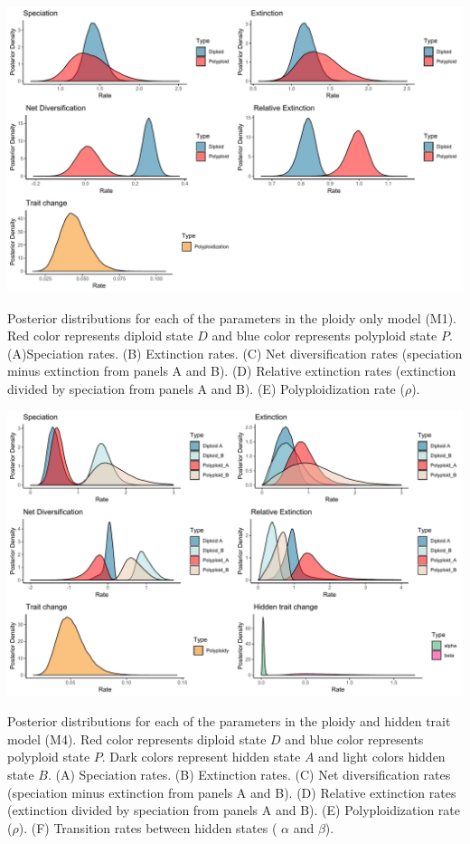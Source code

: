 \begin{suppfigure}
\includegraphics[width=\textwidth]{figS3.pdf}
\caption{Posterior distributions for each of the parameters in the ploidy only model (M1). Red color represents diploid state $D$ and blue color represents polyploid state $P$.  (A)Speciation rates. (B) Extinction rates. (C) Net diversification rates (speciation minus extinction from panels A and B). (D) Relative extinction rates (extinction divided by speciation from panels A and B). (E) Polyploidization rate ($\rho$).} %
\label{suppfigure:DPnodip}
\end{suppfigure}

\begin{suppfigure}
\includegraphics[width=\textwidth]{figS4.pdf}
\caption{Posterior distributions for each of the parameters in the ploidy and hidden trait model (M4). Red color represents diploid state $D$ and blue color represents polyploid state $P$. Dark colors represent hidden state $A$ and light colors hidden state $B$.  (A) Speciation rates. (B) Extinction rates. (C) Net diversification rates (speciation minus extinction from panels A and B). (D) Relative extinction rates (extinction divided by speciation from panels A and B). (E) Polyploidization rate ($\rho$). (F) Transition rates between hidden states ( $\alpha$ and $\beta$).} %
\label{suppfigure:DPnodipAB}
\end{suppfigure}

